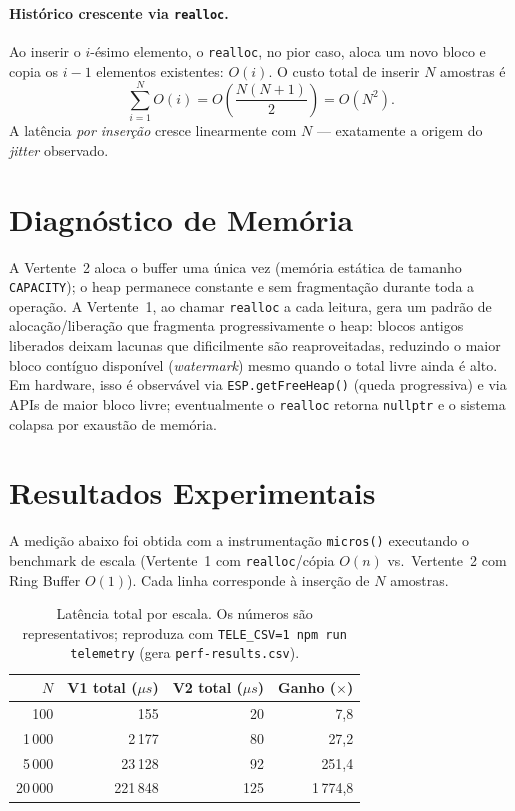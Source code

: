 \documentclass[11pt,a4paper]{article}
\begin{document}
\paragraph{Histórico crescente via \texttt{realloc}.} Ao inserir o $i$-ésimo
elemento, o \texttt{realloc}, no pior caso, aloca um novo bloco e copia os $i-1$
elementos existentes: $O(i)$. O custo total de inserir $N$ amostras é
\[
\sum_{i=1}^{N} O(i) = O\!\left(\frac{N(N+1)}{2}\right) = O(N^2).
\]
A latência \emph{por inserção} cresce linearmente com $N$ --- exatamente a
origem do \emph{jitter} observado.

\section{Diagnóstico de Memória}
A Vertente~2 aloca o buffer uma única vez (memória estática de tamanho
\texttt{CAPACITY}); o heap permanece constante e sem fragmentação durante toda a
operação. A Vertente~1, ao chamar \texttt{realloc} a cada leitura, gera um padrão
de alocação/liberação que fragmenta progressivamente o heap: blocos antigos
liberados deixam lacunas que dificilmente são reaproveitadas, reduzindo o maior
bloco contíguo disponível (\emph{watermark}) mesmo quando o total livre ainda é
alto. Em hardware, isso é observável via \texttt{ESP.getFreeHeap()} (queda
progressiva) e via APIs de maior bloco livre; eventualmente o \texttt{realloc}
retorna \texttt{nullptr} e o sistema colapsa por exaustão de memória.

\section{Resultados Experimentais}
A medição abaixo foi obtida com a instrumentação \texttt{micros()} executando o
benchmark de escala (Vertente~1 com \texttt{realloc}/cópia $O(n)$ vs.\
Vertente~2 com Ring Buffer $O(1)$). Cada linha corresponde à inserção de $N$
amostras.

\begin{table}[h]
\centering
\begin{tabular}{rrrr}
\toprule
$N$ & V1 total ($\mu s$) & V2 total ($\mu s$) & Ganho ($\times$) \\
\midrule
100     & 155      & 20  & 7,8 \\
1\,000  & 2\,177   & 80  & 27,2 \\
5\,000  & 23\,128  & 92  & 251,4 \\
20\,000 & 221\,848 & 125 & 1\,774,8 \\
\bottomrule
\end{tabular}
\caption{Latência total por escala. Os números são representativos; reproduza
com \texttt{TELE\_CSV=1 npm run telemetry} (gera \texttt{perf-results.csv}).}
\label{tab:perf}
\end{table}
\end{document}

